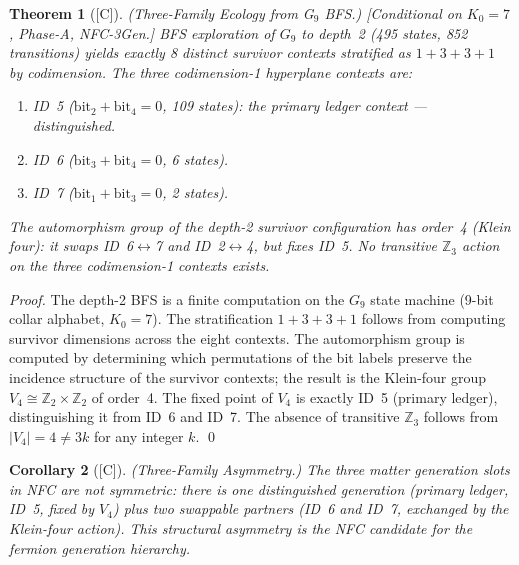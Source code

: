 \documentclass[12pt,oneside]{amsbook}
\theoremstyle{plain}
\newtheorem{theorem}{Theorem}[section]
\newtheorem{corollary}[theorem]{Corollary}
\theoremstyle{definition}
\theoremstyle{remark}
\newcommand{\status}[1]{\textup{[#1]}}
\begin{document}
\begin{theorem}[\status{C}]\label{thm:depth2-ecology}
\textup{(Three-Family Ecology from G$_9$ BFS.)}
\textup{[Conditional on $K_0=7$, Phase-A, NFC-3Gen.]}
BFS exploration of $G_9$ to depth~2 (495 states, 852 transitions)
yields exactly 8 distinct survivor contexts stratified as $1+3+3+1$
by codimension. The three codimension-1 hyperplane contexts are:
\begin{enumerate}[label=\textup{(\arabic*)}]
 \item \emph{ID~5} ($\mathrm{bit}_2 + \mathrm{bit}_4 = 0$, 109 states):
 the \emph{primary ledger} context --- \emph{distinguished}.
 \item \emph{ID~6} ($\mathrm{bit}_3 + \mathrm{bit}_4 = 0$, 6 states).
 \item \emph{ID~7} ($\mathrm{bit}_1 + \mathrm{bit}_3 = 0$, 2 states).
\end{enumerate}
The automorphism group of the depth-2 survivor configuration has
order~4 (Klein four): it swaps ID~6$\leftrightarrow$7 and
ID~2$\leftrightarrow$4, but \emph{fixes ID~5}. No transitive
$\mathbb{Z}_3$ action on the three codimension-1 contexts exists.
\end{theorem}

\begin{proof}
The depth-2 BFS is a finite computation on the $G_9$
state machine (9-bit collar alphabet, $K_0=7$). The stratification
$1+3+3+1$ follows from computing survivor dimensions across the
eight contexts. The automorphism group is computed by determining
which permutations of the bit labels preserve the incidence
structure of the survivor contexts; the result is the Klein-four
group $V_4 \cong \mathbb{Z}_2 \times \mathbb{Z}_2$ of order~4. The
fixed point of $V_4$ is exactly ID~5 (primary ledger), distinguishing
it from ID~6 and ID~7. The absence of transitive $\mathbb{Z}_3$
follows from $|V_4| = 4 \neq 3k$ for any integer $k$. \qed
\end{proof}

\begin{corollary}[\status{C}]\label{cor:three-family-asymmetry}
\textup{(Three-Family Asymmetry.)}
The three matter generation slots in NFC are not symmetric: there is
\emph{one distinguished generation} (primary ledger, ID~5, fixed by
$V_4$) plus \emph{two swappable partners} (ID~6 and ID~7, exchanged
by the Klein-four action). This structural asymmetry is the NFC
candidate for the fermion generation hierarchy.
\end{corollary}
\end{document}
